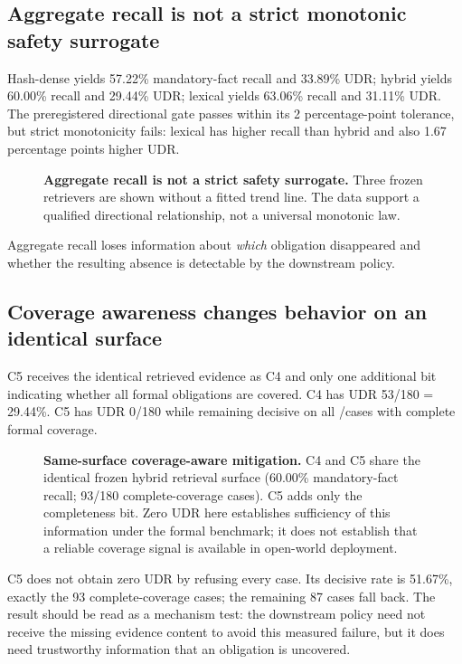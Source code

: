 \subsection{Aggregate recall is not a strict monotonic safety surrogate}

Hash-dense yields 57.22\% mandatory-fact recall and 33.89\% UDR; hybrid yields 60.00\%
recall and 29.44\% UDR; lexical yields 63.06\% recall and 31.11\% UDR. The preregistered
directional gate passes within its 2 percentage-point tolerance, but strict monotonicity
fails: lexical has higher recall than hybrid and also 1.67 percentage points higher UDR.

\begin{figure}[t]
\centering

\caption{\textbf{Aggregate recall is not a strict safety surrogate.} Three frozen
retrievers are shown without a fitted trend line. The data support a qualified directional
relationship, not a universal monotonic law.}
\label{fig:recall}
\end{figure}

Aggregate recall loses information about \emph{which} obligation disappeared and whether
the resulting absence is detectable by the downstream policy.

\subsection{Coverage awareness changes behavior on an identical surface}

C5 receives the identical retrieved evidence as C4 and only one additional bit indicating
whether all formal obligations are covered. C4 has UDR 53/180 = 29.44\%. C5 has UDR
0/180 while remaining decisive on all \HybridCompleteCount/\PtwoN cases with complete
formal coverage.

\begin{figure}[t]
\centering

\caption{\textbf{Same-surface coverage-aware mitigation.} C4 and C5 share the identical
frozen hybrid retrieval surface (60.00\% mandatory-fact recall; 93/180 complete-coverage
cases). C5 adds only the completeness bit. Zero UDR here establishes sufficiency of this
information under the formal benchmark; it does not establish that a reliable coverage
signal is available in open-world deployment.}
\label{fig:coverage}
\end{figure}

C5 does not obtain zero UDR by refusing every case. Its decisive rate is 51.67\%, exactly
the 93 complete-coverage cases; the remaining 87 cases fall back. The result should be read
as a mechanism test: the downstream policy need not receive the missing evidence content
to avoid this measured failure, but it does need trustworthy information that an obligation
is uncovered.
